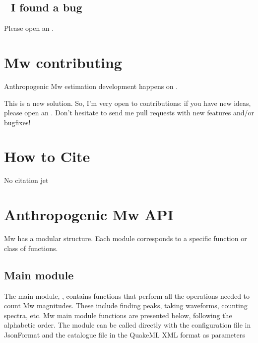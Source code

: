 \documentclass[letterpaper,10pt,english]{sphinxmanual}
\begin{document}
\section{🐞 I found a bug}
\label{\detokenize{getting_help:i-found-a-bug}}
\sphinxAtStartPar
Please open an .

\sphinxstepscope


\chapter{Mw contributing}
\label{\detokenize{contributing:mw-contributing}}\label{\detokenize{contributing:contributing}}\label{\detokenize{contributing::doc}}
\sphinxAtStartPar
Anthropogenic Mw estimation development happens on
.

\sphinxAtStartPar
This is a new solution. So, I’m very open to contributions: if you have new ideas, please open an
.
Don’t hesitate to send me pull requests with new features and/or bugfixes!

\sphinxstepscope


\chapter{How to Cite}
\label{\detokenize{citing:how-to-cite}}\label{\detokenize{citing:id1}}\label{\detokenize{citing::doc}}
\sphinxAtStartPar
No citation jet

\sphinxstepscope


\chapter{Anthropogenic Mw API}
\label{\detokenize{api:anthropogenic-mw-api}}\label{\detokenize{api::doc}}
\sphinxAtStartPar
Mw has a modular structure. Each module corresponds to a specific
function or class of functions.

\sphinxstepscope


\section{Main module}
\label{\detokenize{api_main:main-module}}\label{\detokenize{api_main:api-main}}\label{\detokenize{api_main::doc}}
\sphinxAtStartPar
The main module, , contains functions that perform all the operations needed to count Mw magnitudes.
These include finding peaks, taking waveforms, counting spectra, etc.
Mw main module functions are presented below, following the alphabetic order.
The module  can be called directly with the configuration file in JsonFormat
and the catalogue file in the QuakeML XML format as parameters
\end{document}
